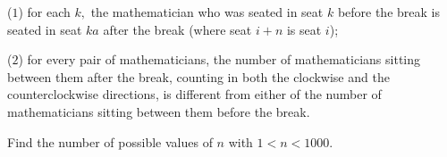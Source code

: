 \begin{enumerate}
 
            \begin{itemize}
($1$) for each $k,$ the mathematician who was seated in seat $k$ before the break is seated in seat $ka$ after the break (where seat $i + n$ is seat $i$);

            \end{itemize}
            
            \begin{itemize}
($2$) for every pair of mathematicians, the number of mathematicians sitting between them after the break, counting in both the clockwise and the counterclockwise directions, is different from either of the number of mathematicians sitting between them before the break.

            \end{itemize}
            Find the number of possible values of $n$ with $1 < n < 1000.$


\end{enumerate}